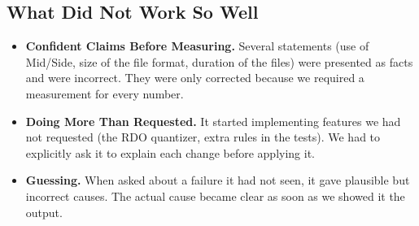 \subsection*{What Did Not Work So Well}

\begin{itemize}
    \item \textbf{Confident Claims Before Measuring.}
    Several statements (use of Mid/Side, size of the file format,
    duration of the files) were presented as facts and were incorrect.
    They were only corrected because we required a measurement for
    every number.

    \item \textbf{Doing More Than Requested.}
    It started implementing features we had not requested (the RDO
    quantizer, extra rules in the tests). We had to explicitly ask it
    to explain each change before applying it.

    \item \textbf{Guessing.}
    When asked about a failure it had not seen, it gave plausible but
    incorrect causes. The actual cause became clear as soon as we
    showed it the output.

\end{itemize}